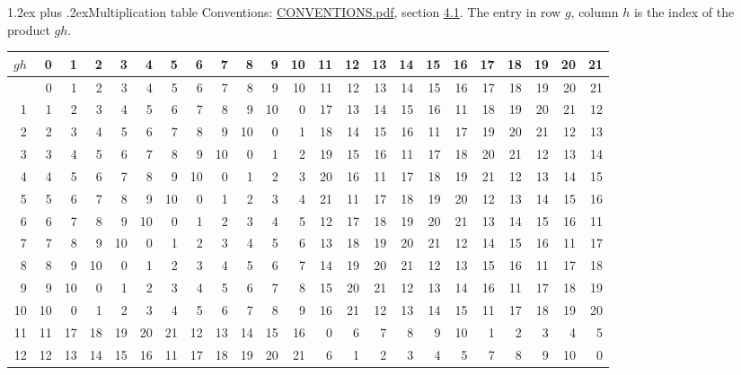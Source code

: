 \documentclass[10pt,a4paper]{article}
\makeatletter
\renewcommand\section{\@startsection{section}{1}{\z@}{-3ex plus -1ex minus -.2ex}%
  {1.2ex plus .2ex}{\normalfont\large\sffamily\bfseries\color{parttitle}}}
\numberwithin{equation}{section}
\makeatother
\begin{document}
\section{Multiplication table}\label{s:multiplication}
Conventions: \href{../../CONVENTIONS.pdf}{CONVENTIONS.pdf}, section \href{../../CONVENTIONS.pdf\#conv.4.1}{4.1}.
The entry in row $g$, column $h$ is the index of the product $gh$.
{\normalsize\setlength{\tabcolsep}{0.1em}\setlength{\LTleft}{-8pt plus 1fill}\setlength{\LTright}{-8pt plus 1fill}\begin{longtable}{@{}r|rrrrrrrrrrrrrrrrrrrrrr@{}}\toprule
$gh$ & 0 & 1 & 2 & 3 & 4 & 5 & 6 & 7 & 8 & 9 & 10 & 11 & 12 & 13 & 14 & 15 & 16 & 17 & 18 & 19 & 20 & 21\\\midrule\endhead
\bottomrule\endfoot\endlastfoot
0 & 0 & 1 & 2 & 3 & 4 & 5 & 6 & 7 & 8 & 9 & 10 & 11 & 12 & 13 & 14 & 15 & 16 & 17 & 18 & 19 & 20 & 21\\*
1 & 1 & 2 & 3 & 4 & 5 & 6 & 7 & 8 & 9 & 10 & 0 & 17 & 13 & 14 & 15 & 16 & 11 & 18 & 19 & 20 & 21 & 12\\
2 & 2 & 3 & 4 & 5 & 6 & 7 & 8 & 9 & 10 & 0 & 1 & 18 & 14 & 15 & 16 & 11 & 17 & 19 & 20 & 21 & 12 & 13\\
3 & 3 & 4 & 5 & 6 & 7 & 8 & 9 & 10 & 0 & 1 & 2 & 19 & 15 & 16 & 11 & 17 & 18 & 20 & 21 & 12 & 13 & 14\\
4 & 4 & 5 & 6 & 7 & 8 & 9 & 10 & 0 & 1 & 2 & 3 & 20 & 16 & 11 & 17 & 18 & 19 & 21 & 12 & 13 & 14 & 15\\
5 & 5 & 6 & 7 & 8 & 9 & 10 & 0 & 1 & 2 & 3 & 4 & 21 & 11 & 17 & 18 & 19 & 20 & 12 & 13 & 14 & 15 & 16\\
6 & 6 & 7 & 8 & 9 & 10 & 0 & 1 & 2 & 3 & 4 & 5 & 12 & 17 & 18 & 19 & 20 & 21 & 13 & 14 & 15 & 16 & 11\\
7 & 7 & 8 & 9 & 10 & 0 & 1 & 2 & 3 & 4 & 5 & 6 & 13 & 18 & 19 & 20 & 21 & 12 & 14 & 15 & 16 & 11 & 17\\
8 & 8 & 9 & 10 & 0 & 1 & 2 & 3 & 4 & 5 & 6 & 7 & 14 & 19 & 20 & 21 & 12 & 13 & 15 & 16 & 11 & 17 & 18\\
9 & 9 & 10 & 0 & 1 & 2 & 3 & 4 & 5 & 6 & 7 & 8 & 15 & 20 & 21 & 12 & 13 & 14 & 16 & 11 & 17 & 18 & 19\\
10 & 10 & 0 & 1 & 2 & 3 & 4 & 5 & 6 & 7 & 8 & 9 & 16 & 21 & 12 & 13 & 14 & 15 & 11 & 17 & 18 & 19 & 20\\
11 & 11 & 17 & 18 & 19 & 20 & 21 & 12 & 13 & 14 & 15 & 16 & 0 & 6 & 7 & 8 & 9 & 10 & 1 & 2 & 3 & 4 & 5\\
12 & 12 & 13 & 14 & 15 & 16 & 11 & 17 & 18 & 19 & 20 & 21 & 6 & 1 & 2 & 3 & 4 & 5 & 7 & 8 & 9 & 10 & 0\\

\end{longtable}}
\end{document}
